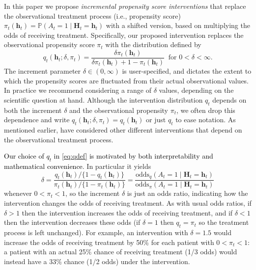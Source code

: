 \documentclass[12pt]{article}
\newcommand{\Pb}{\mathbb{P}}
\newcommand{\bH}{\mathbf{H}}
\newcommand{\bh}{\mathbf{h}}
\theoremstyle{remark}
\begin{document}
In this paper we propose \textit{incremental propensity score interventions} that replace the observational treatment process (i.e., propensity score) $\pi_t(\bh_t) = \Pb(A_t= 1 \mid \bH_t=\bh_t)$ with a shifted version, based on multiplying the odds of receiving treatment. Specifically, our proposed intervention replaces the observational propensity score $\pi_t$ with the distribution defined by
\begin{equation}
q_t( \bh_t; \delta, \pi_t) = \frac{ \delta \pi_t( \bh_t) }{ \delta \pi_t(\bh_t) + 1 - \pi_t(\bh_t) } \ \text{ for } 0 < \delta < \infty .
\label{eq:qdef}
\end{equation}
The increment parameter $\delta \in (0,\infty)$ is user-specified, and dictates the extent to which the propensity scores are fluctuated from their actual observational values. In practice we recommend considering a range of $\delta$ values, depending on the scientific question at hand. Although the intervention distribution $q_t$ depends on both the increment $\delta$ and the observational propensity $\pi_t$, we often drop this dependence and write $q_t(\bh_t; \delta,\pi_t) = q_t(\bh_t)$ or just $q_t$ to ease notation. As mentioned earlier, \textcite{diaz2012population, moore2012causal, diaz2013assessing, haneuse2013estimation, young2014identification} {have considered other different interventions that depend on the observational treatment process}.

\textcolor{black}{Our choice of $q_t$ in \eqref{eq:qdef} is motivated by both interpretability and mathematical convenience}. In particular it yields
$$ \delta = \frac{ q_t( \bh_t) / \{1 - q_t( \bh_t) \} } {\pi_t( \bh_t) / \{1- \pi_t( \bh_t)\}} = \frac{\text{odds}_q(A_t=1 \mid \bH_t=\bh_t)}{\text{odds}_\pi(A_t=1 \mid \bH_t=\bh_t)} $$
whenever $0 < \pi_t < 1$, %
so the increment $\delta$ is just an odds ratio, indicating how the intervention changes the odds of receiving treatment. As with usual odds ratios, if $\delta> 1$ then the intervention increases the odds of receiving treatment, and if $\delta  < 1$ then the intervention decreases these odds (if $\delta=1$ then $q_t=\pi_t$ so the treatment process is left unchanged). For example, an intervention with $\delta =1.5$ would increase the odds of receiving treatment by 50\% for each patient with $0 < \pi_t < 1$: a patient with an actual 25\% chance of receiving treatment (1/3 odds) would instead have a  33\% chance (1/2 odds) under the intervention.
\end{document}
